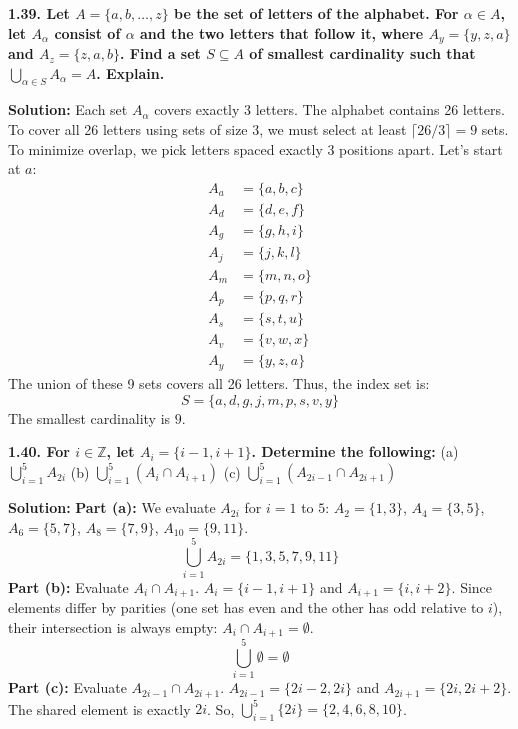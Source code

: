 \documentclass[12pt]{article}
\begin{document}
\hrulefill

\textbf{1.39. Let $A = \{a, b, \ldots, z\}$ be the set of letters of the alphabet. For $\alpha \in A$, let $A_\alpha$ consist of $\alpha$ and the two letters that follow it, where $A_y = \{y, z, a\}$ and $A_z = \{z, a, b\}$. Find a set $S \subseteq A$ of smallest cardinality such that $\bigcup_{\alpha \in S} A_\alpha = A$. Explain.}

\textbf{Solution:}
Each set $A_\alpha$ covers exactly 3 letters. The alphabet contains 26 letters. To cover all 26 letters using sets of size 3, we must select at least $\lceil 26 / 3 \rceil = 9$ sets.
To minimize overlap, we pick letters spaced exactly 3 positions apart. Let's start at $a$:
\begin{align*}
    A_a &= \{a, b, c\} \\
    A_d &= \{d, e, f\} \\
    A_g &= \{g, h, i\} \\
    A_j &= \{j, k, l\} \\
    A_m &= \{m, n, o\} \\
    A_p &= \{p, q, r\} \\
    A_s &= \{s, t, u\} \\
    A_v &= \{v, w, x\} \\
    A_y &= \{y, z, a\}
\end{align*}
The union of these 9 sets covers all 26 letters. Thus, the index set is:
\[ S = \{a, d, g, j, m, p, s, v, y\} \]
The smallest cardinality is $9$.

\hrulefill

\textbf{1.40. For $i \in \mathbb{Z}$, let $A_i = \{i-1, i+1\}$. Determine the following:}
(a) $\bigcup_{i=1}^5 A_{2i}$ \quad (b) $\bigcup_{i=1}^5 (A_i \cap A_{i+1})$ \quad (c) $\bigcup_{i=1}^5 (A_{2i-1} \cap A_{2i+1})$

\textbf{Solution:}
\textbf{Part (a):} We evaluate $A_{2i}$ for $i=1$ to $5$:
$A_2 = \{1, 3\}$, $A_4 = \{3, 5\}$, $A_6 = \{5, 7\}$, $A_8 = \{7, 9\}$, $A_{10} = \{9, 11\}$.
\[ \bigcup_{i=1}^5 A_{2i} = \{1, 3, 5, 7, 9, 11\} \]
\textbf{Part (b):} Evaluate $A_i \cap A_{i+1}$.
$A_i = \{i-1, i+1\}$ and $A_{i+1} = \{i, i+2\}$. Since elements differ by parities (one set has even and the other has odd relative to $i$), their intersection is always empty: $A_i \cap A_{i+1} = \emptyset$.
\[ \bigcup_{i=1}^5 \emptyset = \emptyset \]
\textbf{Part (c):} Evaluate $A_{2i-1} \cap A_{2i+1}$.
$A_{2i-1} = \{2i-2, 2i\}$ and $A_{2i+1} = \{2i, 2i+2\}$. The shared element is exactly $2i$.
So, $\bigcup_{i=1}^5 \{2i\} = \{2, 4, 6, 8, 10\}$.
\end{document}
